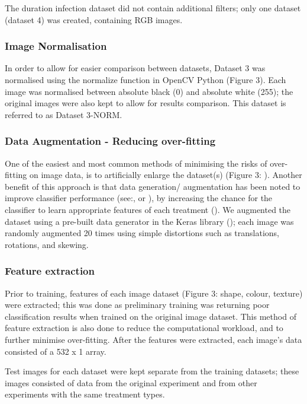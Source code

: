 \documentclass[../../Paper.tex]{subfiles}
\begin{document}
The duration infection dataset did not contain additional filters; only one dataset (dataset 4) was created, containing RGB images.

\subsubsection*{Image Normalisation}

In order to allow for easier comparison between datasets, Dataset 3 was normalised using the normalize function in OpenCV Python (Figure 3). Each image was normalised between absolute black (0) and absolute white (255); the original images were also kept to allow for results comparison. This dataset is referred to as Dataset 3-NORM.

\subsubsection*{Data Augmentation - Reducing over-fitting}

One of the easiest and most common methods of minimising the risks of over-fitting on image data, is to artificially enlarge
the dataset(s) (Figure 3: \cite{simard_best_2003,krizhevsky_imagenet_2012,sladojevic_deep_2016, ubbens_deep_2017}). Another benefit of this approach is that data generation/ augmentation has been noted to improve classifier performance (see:\cite{yaeger_effective_1996}, or \cite{krizhevsky_imagenet_2012}),  by increasing the chance for the classifier to learn appropriate features of each treatment (\cite{sladojevic_deep_2016}). We augmented the dataset using a pre-built data generator in the Keras library (\cite{chollet2015keras}); each image was randomly augmented 20 times using simple  distortions such as translations,  rotations, and  
skewing.

\subsubsection*{Feature extraction}

Prior to training, features of each image dataset (Figure 3: shape, colour, texture) were extracted; this was done as preliminary training was returning poor classification results when trained on the original image dataset. This method of feature extraction is also done to reduce the computational workload, and to further minimise over-fitting. After the features were extracted, each image's data consisted of a 532 x 1 array. 

Test images for each dataset were kept separate from the training datasets; these images consisted of data from the original experiment and from other experiments with the same treatment types.
\end{document}
